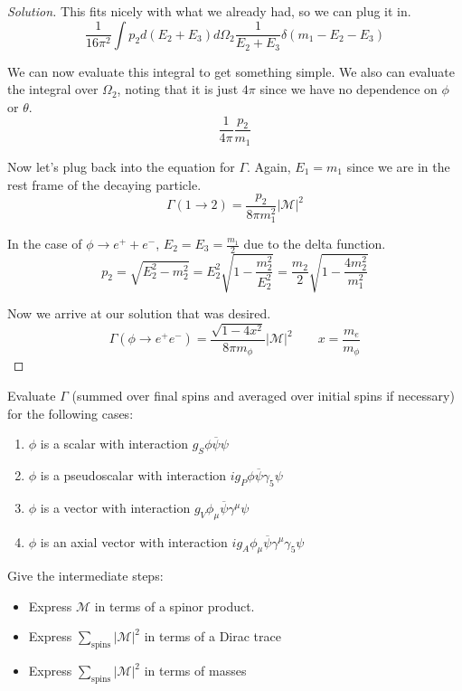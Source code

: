 \documentclass[12pt]{article}
\newenvironment{questionpart}[2][Part]{\begin{trivlist}
\item[\hskip \labelsep \hskip \labelsep {\bfseries (#2)}]}{\end{trivlist}}
\newenvironment{solution}{\begin{proof}[Solution]}{\end{proof}}
\begin{document}
\begin{solution}
This fits nicely with what we already had, so we can plug it in.
\begin{equation*}
    \frac{1}{16\pi^2}\int p_2 d(E_2+E_3)d\Omega_2\frac{1}{E_2+E_3}\delta(m_1-E_2-E_3)
\end{equation*}

We can now evaluate this integral to get something simple. We also can evaluate the integral over $\Omega_2$, noting that it is just $4\pi$ since we have no dependence on $\phi$ or $\theta$.
\begin{equation*}
    \frac{1}{4\pi}\frac{p_2}{m_1}
\end{equation*}

Now let's plug back into the equation for $\Gamma$. Again, $E_1=m_1$ since we are in the rest frame of the decaying particle.
\begin{equation*}
    \Gamma(1\rightarrow 2)=\frac{p_2}{8\pi m_1^2}|\mathcal{M}|^2
\end{equation*}

In the case of $\phi\rightarrow e^++e^-$, $E_2=E_3=\frac{m_1}{2}$ due to the delta function.
\begin{equation*}
    p_2=\sqrt{E_2^2-m_2^2}=E_2^2\sqrt{1-\frac{m_2^2}{E_2^2}}=\frac{m_2}{2}\sqrt{1-\frac{4m_2^2}{m_1^2}}
\end{equation*}

Now we arrive at our solution that was desired.
\begin{equation*}
    \Gamma(\phi\rightarrow e^+e^-)=\frac{\sqrt{1-4x^2}}{8\pi m_\phi}|\mathcal{M}|^2 \qquad x=\frac{m_e}{m_\phi}
\end{equation*}
\end{solution}

\begin{questionpart}{b}
Evaluate $\Gamma$ (summed over final spins and averaged over initial spins if necessary) for the following cases:
\begin{enumerate}
    \item $\phi$ is a scalar with interaction $g_S \phi \overline{\psi}\psi$ 
    \item $\phi$ is a pseudoscalar with interaction $ig_P \phi \overline{\psi}\gamma_5\psi$ 
    \item $\phi$ is a vector with interaction $g_V \phi_\mu \overline{\psi}\gamma^\mu\psi$ 
    \item $\phi$ is an axial vector with interaction $ig_A \phi_\mu \overline{\psi}\gamma^\mu\gamma_5\psi$ 
\end{enumerate}
\hfill \break
Give the intermediate steps:
\begin{itemize}
    \item Express $\mathcal{M}$ in terms of a spinor product.
    \item Express $\sum_{\text{spins}}|\mathcal{M}|^2$ in terms of a Dirac trace
    \item Express $\sum_{\text{spins}}|\mathcal{M}|^2$ in terms of masses
\end{itemize}
\end{questionpart}
\end{document}
